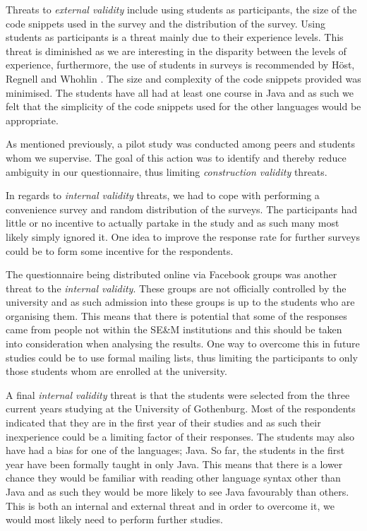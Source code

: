 \documentclass[10pt,twocolumn]{article}
\begin{document}
Threats to \textit{external validity} include using students as participants, the size of the code snippets used in the survey and the distribution of the survey. Using students as participants is a threat mainly due to their experience levels. This threat is diminished as we are interesting in the disparity between the levels of experience, furthermore, the use of students in surveys is recommended by Höst, Regnell and Whohlin \cite{host2000using}. The size and complexity of the code snippets provided was minimised. The students have all had at least one course in Java and as such we felt that the simplicity of the code snippets used for the other languages would be appropriate.

As mentioned previously, a pilot study was conducted among peers and students whom we supervise. The goal of this action was to identify and thereby reduce ambiguity in our questionnaire, thus limiting \textit{construction validity} threats.

In regards to \textit{internal validity} threats, we had to cope with performing a convenience survey and random distribution of the surveys. The participants had little or no incentive to actually partake in the study and as such many most likely simply ignored it. One idea to improve the response rate for further surveys could be to form some incentive for the respondents.

The questionnaire being distributed online via Facebook groups was another threat to the \textit{internal validity}. These groups are not officially controlled by the university and as such admission into these groups is up to the students who are organising them. This means that there is potential that some of the responses came from people not within the SE\&M institutions and this should be taken into consideration when analysing the results. One way to overcome this in future studies could be to use formal mailing lists, thus limiting the participants to only those students whom are enrolled at the university.

A final \textit{internal validity} threat is that the students were selected from the three current years studying at the University of Gothenburg. Most of the respondents indicated that they are in the first year of their studies and as such their inexperience could be a limiting factor of their responses. The students may also have had a bias for one of the languages; Java. So far, the students in the first year have been formally taught in only Java. This means that there is a lower chance they would be familiar with reading other language syntax other than Java and as such they would be more likely to see Java favourably than others. This is both an internal and external threat and in order to overcome it, we would most likely need to perform further studies.
\end{document}
